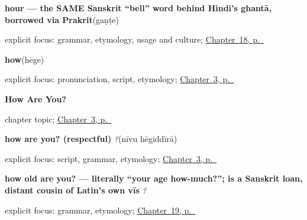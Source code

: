 \noindent\begin{minipage}[t]{\linewidth}
\raggedright
\textbf{hour — the SAME Sanskrit \textquotedblleft{}bell\textquotedblright{} word behind Hindi's ghantā, borrowed via Prakrit}\enspace\emph{}\enspace(gaṇṭe)\par
\footnotesize explicit focus: grammar, etymology, usage and culture; \hyperref[ch:ka-telling-time]{Chapter~18, p.~\pageref*{ch:ka-telling-time}}
\end{minipage}\par\smallskip

\noindent\begin{minipage}[t]{\linewidth}
\raggedright
\textbf{how}\enspace\emph{}\enspace(hēge)\par
\footnotesize explicit focus: pronunciation, script, etymology; \hyperref[ch:responding]{Chapter~3, p.~\pageref*{ch:responding}}
\end{minipage}\par\smallskip

\noindent\begin{minipage}[t]{\linewidth}
\raggedright
\textbf{How Are You?}\par
\footnotesize chapter topic; \hyperref[ch:responding]{Chapter~3, p.~\pageref*{ch:responding}}
\end{minipage}\par\smallskip

\noindent\begin{minipage}[t]{\linewidth}
\raggedright
\textbf{how are you? (respectful)}\enspace\emph{ ?}\enspace(nīvu hēgiddīrā)\par
\footnotesize explicit focus: script, grammar, etymology; \hyperref[ch:responding]{Chapter~3, p.~\pageref*{ch:responding}}
\end{minipage}\par\smallskip

\noindent\begin{minipage}[t]{\linewidth}
\raggedright
\textbf{how old are you? — literally \textquotedblleft{}your age how-much?\textquotedblright{};  is a Sanskrit loan, distant cousin of Latin's own vīs}\enspace\emph{  ?}\par
\footnotesize explicit focus: grammar, etymology; \hyperref[ch:ka-asking-age]{Chapter~19, p.~\pageref*{ch:ka-asking-age}}
\end{minipage}\par\smallskip

